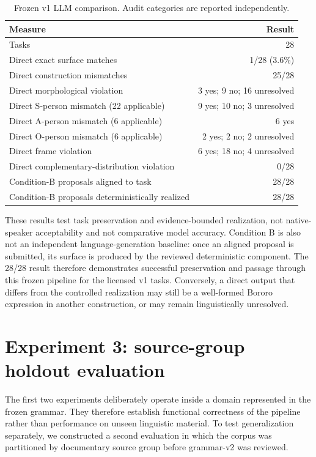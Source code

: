 \documentclass[11pt]{article}
\begin{document}
\begin{table}[ht]
\centering
\caption{Frozen v1 LLM comparison. Audit categories are reported independently.}
\label{tab:v1llmresults}
\begin{tabular}{lr}
\toprule
Measure & Result\\
\midrule
Tasks & 28\\
Direct exact surface matches & 1/28 (3.6\%)\\
Direct construction mismatches & 25/28\\
Direct morphological violation & 3 yes; 9 no; 16 unresolved\\
Direct S-person mismatch (22 applicable) & 9 yes; 10 no; 3 unresolved\\
Direct A-person mismatch (6 applicable) & 6 yes\\
Direct O-person mismatch (6 applicable) & 2 yes; 2 no; 2 unresolved\\
Direct frame violation & 6 yes; 18 no; 4 unresolved\\
Direct complementary-distribution violation & 0/28\\
Condition-B proposals aligned to task & 28/28\\
Condition-B proposals deterministically realized & 28/28\\
\bottomrule
\end{tabular}
\end{table}

These results test task preservation and evidence-bounded realization, not
native-speaker acceptability and not comparative model accuracy. Condition B is
also not an independent language-generation baseline: once an aligned proposal
is submitted, its surface is produced by the reviewed deterministic component.
The 28/28 result therefore demonstrates successful preservation and passage
through this frozen pipeline for the licensed v1 tasks. Conversely, a direct
output that differs from the controlled realization may still be a well-formed
Bororo expression in another construction, or may remain linguistically
unresolved.


\section{Experiment 3: source-group holdout evaluation}
\label{sec:holdout}

The first two experiments deliberately operate inside a domain represented in
the frozen grammar. They therefore establish functional correctness of the
pipeline rather than performance on unseen linguistic material. To test
generalization separately, we constructed a second evaluation in which the
corpus was partitioned by documentary source group before grammar-v2 was
reviewed.
\end{document}
